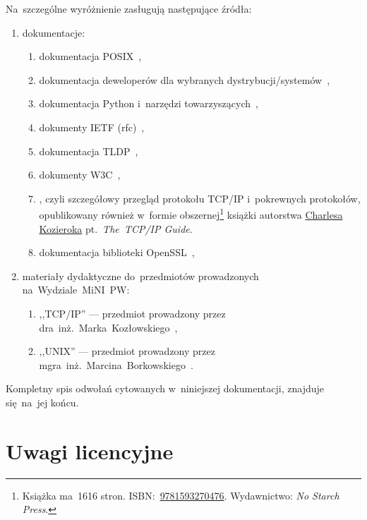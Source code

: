 \documentclass[thesis]{subfiles}
\begin{document}
\noindent Na~szczególne wyróżnienie zasługują następujące źródła:
\begin{enumerate}
	\item dokumentacje:
	\begin{enumerate}
		\item dokumentacja POSIX~\cite{posix},
		\item dokumentacja deweloperów dla wybranych dystrybucji/systemów~\cite{archlinux-wiki,gentoo-wiki},
		\item dokumentacja Python i~narzędzi towarzyszących~\cite{python-doc},%
		\item dokumenty IETF (\gls{rfc})~\cite{rfc-editor},
		\item dokumentacja TLDP~\cite{tldp},
		\item dokumenty W3C~\cite{w3c},
		\item {}, czyli szczegółowy przegląd protokołu TCP/IP i~pokrewnych protokołów, opublikowany również w~formie obszernej\footnote{Książka ma~1616 stron. ISBN:~\href{https://www.nostarch.com/tcpip.htm}{9781593270476}. Wydawnictwo: \emph{No Starch Press}.} książki autorstwa \href{https://www.linkedin.com/in/charles-kozierok-708112/}{\mbox{Charlesa} \mbox{Kozieroka}} pt.~\emph{The~TCP/IP Guide}.
		\item dokumentacja biblioteki OpenSSL~\cite{openssl-doc},
	\end{enumerate}
	\item materiały dydaktyczne do~przedmiotów prowadzonych na~Wydziale~MiNI~PW:
	\begin{enumerate}
		\item ,,TCP/IP'' --- przedmiot prowadzony przez dra~inż.~Marka~Kozłowskiego~\cite{kozlowski},
		\item ,,UNIX'' --- przedmiot prowadzony przez mgra~inż.~Marcina~Borkowskiego~\cite{borkowski}.
	\end{enumerate}
\end{enumerate}
Kompletny spis odwołań cytowanych w~niniejszej dokumentacji, znajduje się~na~jej końcu. %


\section{Uwagi licencyjne}
\end{document}

